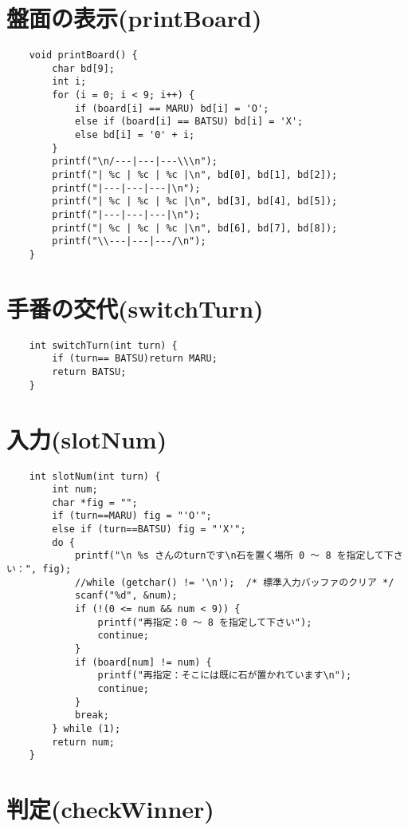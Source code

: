 \documentclass[uplatex,a4paper,11pt,oneside,openany]{jsarticle}
\begin{document}
\section{盤面の表示(printBoard)}

\begin{lstlisting}
	void printBoard() {
		char bd[9];
		int i;
		for (i = 0; i < 9; i++) {
			if (board[i] == MARU) bd[i] = 'O';
			else if (board[i] == BATSU) bd[i] = 'X';
			else bd[i] = '0' + i;
		}
		printf("\n/---|---|---\\\n");
		printf("| %c | %c | %c |\n", bd[0], bd[1], bd[2]);
		printf("|---|---|---|\n");
		printf("| %c | %c | %c |\n", bd[3], bd[4], bd[5]);
		printf("|---|---|---|\n");
		printf("| %c | %c | %c |\n", bd[6], bd[7], bd[8]);
		printf("\\---|---|---/\n");
	}
\end{lstlisting}

\section{手番の交代(switchTurn)}

\begin{lstlisting}
	int switchTurn(int turn) {
		if (turn== BATSU)return MARU;
		return BATSU;
	}
\end{lstlisting}

\section{入力(slotNum)}

\begin{lstlisting}
	int slotNum(int turn) {
		int num;
		char *fig = "";
		if (turn==MARU) fig = "'O'";
		else if (turn==BATSU) fig = "'X'";
		do {
			printf("\n %s さんのturnです\n石を置く場所 0 〜 8 を指定して下さい：", fig);
			//while (getchar() != '\n');  /* 標準入力バッファのクリア */
			scanf("%d", &num);
			if (!(0 <= num && num < 9)) {
				printf("再指定：0 〜 8 を指定して下さい");
				continue;
			}
			if (board[num] != num) {
				printf("再指定：そこには既に石が置かれています\n");
				continue;
			}
			break;
		} while (1);
		return num;
	}
\end{lstlisting}

\section{判定(checkWinner)}
\end{document}
